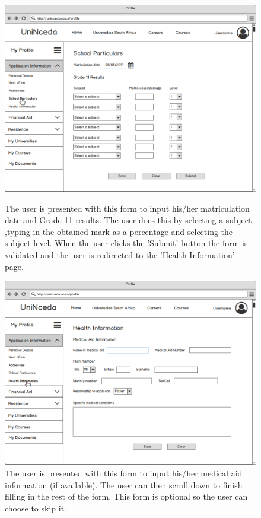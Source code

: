 \documentclass[a4paper, 12pt]{article}
\begin{document}
\begin{figure}[H]
\centering
\includegraphics[scale=0.4]{ProfileAppInfoSchoolParticulars}
\caption{The user is presented with this form to  input his/her matriculation date and Grade 11 results. The user does this by selecting a subject ,typing in the obtained mark as a percentage and selecting the subject level. When the user clicks the 'Submit' button the form is validated and the user is redirected to the 'Health Information' page.}
\label{ProfileAppInfoSchoolParticulars}

\vspace{1cm}

\includegraphics[scale=0.4]{ProfileAppInfoHealthInformation}
\caption{The user is presented with this form to input his/her medical aid information (if available). The user can then scroll down to finish filling in the rest of the form. This form is optional so the user can choose to skip it.}
\label{ProfileAppInfoHealthInformation}


\end{figure}
\end{document}

